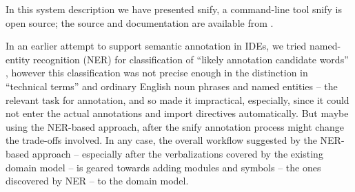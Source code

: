 \documentclass{llncs}
\newcommand\snify{\textsf{snify}\xspace}
\begin{document}
In this system description we have presented \snify, a command-line tool
 \snify is open source;
the source and documentation are available from \cite{stextools:git}.

In an earlier attempt to support semantic annotation in IDEs, we tried named-entity
recognition (NER) for classification of ``likely annotation candidate words''
\cite{hutterer:msc23}, however this classification was not precise enough in the
distinction in ``technical terms'' and ordinary English noun phrases and named entities --
the relevant task for annotation, and so made it impractical, especially, since it could
not enter the actual annotations and import directives automatically. But maybe using the
NER-based approach, after the \snify annotation process might change the trade-offs
involved. In any case, the overall workflow suggested by the NER-based approach --
especially after the verbalizations covered by the existing domain model -- is geared towards adding modules and symbols -- the ones discovered by NER
-- to the domain model. 



\printbibliography
\end{document}
